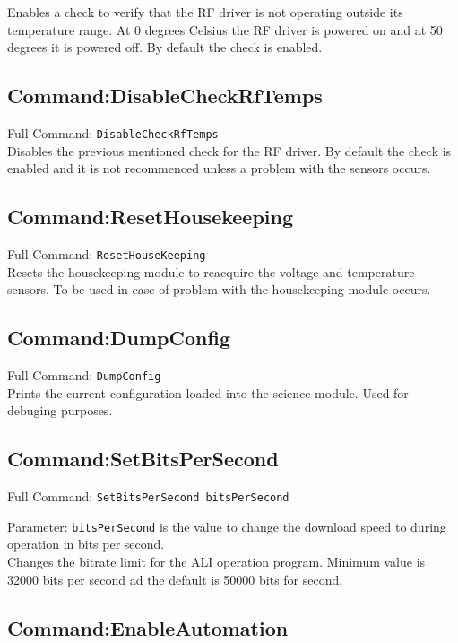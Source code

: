 Enables a check to verify that the RF driver is not operating outside its temperature range. At 0 degrees Celsius the RF driver is powered on and at 50 degrees it is powered off. By default the check is enabled.

\subsection{Command:DisableCheckRfTemps}

Full Command: \texttt{DisableCheckRfTemps}\\

Disables the previous mentioned check for the RF driver. By default the check is enabled and it is not recommenced unless a problem with the sensors occurs.

\subsection{Command:ResetHousekeeping}

Full Command: \texttt{ResetHouseKeeping}\\

Resets the housekeeping module to reacquire the voltage and temperature sensors. To be used in case of problem with the housekeeping module occurs.

\subsection{Command:DumpConfig}

Full Command: \texttt{DumpConfig}\\

Prints the current configuration loaded into the science module. Used for debuging purposes.

\subsection{Command:SetBitsPerSecond}

Full Command: \texttt{SetBitsPerSecond bitsPerSecond}

Parameter: \texttt{bitsPerSecond} is the value to change the download speed to during operation in bits per second.\\

Changes the bitrate limit for the ALI operation program. Minimum value is 32000 bits per second ad the default is 50000 bits for second.

\subsection{Command:EnableAutomation}

